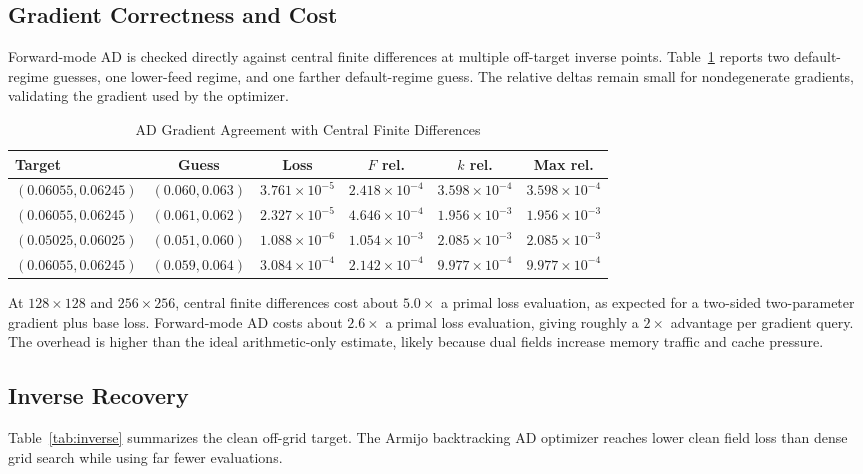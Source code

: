 \documentclass[journal]{IEEEtran}
\begin{document}
\subsection{Gradient Correctness and Cost}
Forward-mode AD is checked directly against central finite differences at
multiple off-target inverse points. Table~\ref{tab:gradient} reports two
default-regime guesses, one lower-feed regime, and one farther default-regime
guess. The relative deltas remain small for nondegenerate gradients, validating
the gradient used by the optimizer.

\begin{table}[!t]
\renewcommand{\arraystretch}{1.15}
\caption{AD Gradient Agreement with Central Finite Differences}
\label{tab:gradient}
\centering
\begin{tabular}{lccccc}
\hline
Target & Guess & Loss & \(F\) rel. & \(k\) rel. & Max rel.\\
\hline
\((0.06055,0.06245)\) & \((0.060,0.063)\) & \(3.761{\times}10^{-5}\) & \(2.418{\times}10^{-4}\) & \(3.598{\times}10^{-4}\) & \(3.598{\times}10^{-4}\)\\
\((0.06055,0.06245)\) & \((0.061,0.062)\) & \(2.327{\times}10^{-5}\) & \(4.646{\times}10^{-4}\) & \(1.956{\times}10^{-3}\) & \(1.956{\times}10^{-3}\)\\
\((0.05025,0.06025)\) & \((0.051,0.060)\) & \(1.088{\times}10^{-6}\) & \(1.054{\times}10^{-3}\) & \(2.085{\times}10^{-3}\) & \(2.085{\times}10^{-3}\)\\
\((0.06055,0.06245)\) & \((0.059,0.064)\) & \(3.084{\times}10^{-4}\) & \(2.142{\times}10^{-4}\) & \(9.977{\times}10^{-4}\) & \(9.977{\times}10^{-4}\)\\
\hline
\end{tabular}
\end{table}

At \(128\times128\) and \(256\times256\), central finite differences cost about
\(5.0\times\) a primal loss evaluation, as expected for a two-sided
two-parameter gradient plus base loss. Forward-mode AD costs about \(2.6\times\)
a primal loss evaluation, giving roughly a \(2\times\) advantage per gradient
query. The overhead is higher than the ideal arithmetic-only estimate, likely
because dual fields increase memory traffic and cache pressure.

\subsection{Inverse Recovery}
Table~\ref{tab:inverse} summarizes the clean off-grid target. The Armijo
backtracking AD optimizer reaches lower clean field loss than dense grid search
while using far fewer evaluations.
\end{document}
